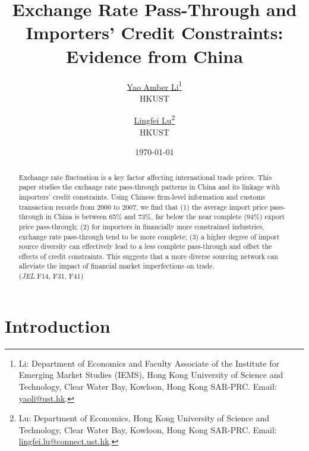 \documentclass[12pt]{article}
\begin{document}
\title{  \Large \textbf{Exchange Rate Pass-Through and Importers' Credit Constraints: Evidence from China}}

\author{\large \href{http://yaoli.people.ust.hk/}{Yao Amber Li}\thanks{Li: Department of Economics and Faculty Associate of the Institute for Emerging Market Studies (IEMS), Hong Kong University of Science and Technology, Clear Water Bay, Kowloon, Hong Kong SAR-PRC. Email: \href{mailto:yaoli@ust.hk}{yaoli@ust.hk}.}\\ \large{HKUST}
\and \large \href{}{Lingfei Lu}\thanks{Lu: Department of Economics, Hong Kong University of Science and Technology, Clear Water Bay, Kowloon, Hong Kong SAR-PRC. Email: \href{mailto:}{lingfei.lu@connect.ust.hk}.} \\ \large{HKUST}
 }

\date{\today }

\maketitle

\begin{abstract}
Exchange rate fluctuation is a key factor affecting international trade prices. This paper studies the exchange rate pass-through patterns in China and its linkage with importers' credit constraints. Using Chinese firm-level information and customs transaction records from 2000 to 2007, we find that (1) the average import price pass-through in China is between 65\% and 73\%, far below the near complete (94\%) export price pass-through; (2) for importers in financially more constrained industries, exchange rate pass-through tend to be more complete; (3) a higher degree of import source diversity can effectively lead to a less complete pass-through and offset the effects of credit constraints. This suggests that a more diverse sourcing network can alleviate the impact of financial market imperfections on trade.\\
(\textit{JEL} F14, F31, F41)

\end{abstract}

\section{Introduction} \label{Introduction}
\end{document}
